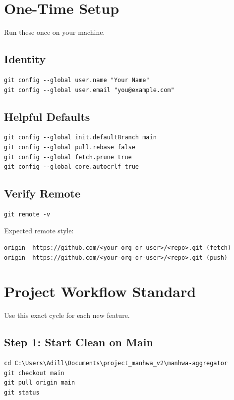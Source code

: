 \documentclass[11pt,a4paper]{article}
\begin{document}
\section{One-Time Setup}
Run these once on your machine.

\subsection{Identity}
\begin{Verbatim}[fontsize=\small]
git config --global user.name "Your Name"
git config --global user.email "you@example.com"
\end{Verbatim}

\subsection{Helpful Defaults}
\begin{Verbatim}[fontsize=\small]
git config --global init.defaultBranch main
git config --global pull.rebase false
git config --global fetch.prune true
git config --global core.autocrlf true
\end{Verbatim}

\subsection{Verify Remote}
\begin{Verbatim}[fontsize=\small]
git remote -v
\end{Verbatim}

Expected remote style:
\begin{Verbatim}[fontsize=\small]
origin  https://github.com/<your-org-or-user>/<repo>.git (fetch)
origin  https://github.com/<your-org-or-user>/<repo>.git (push)
\end{Verbatim}

\section{Project Workflow Standard}
Use this exact cycle for each new feature.

\subsection{Step 1: Start Clean on Main}
\begin{Verbatim}[fontsize=\small]
cd C:\Users\Adill\Documents\project_manhwa_v2\manhwa-aggregator
git checkout main
git pull origin main
git status
\end{Verbatim}
\end{document}
